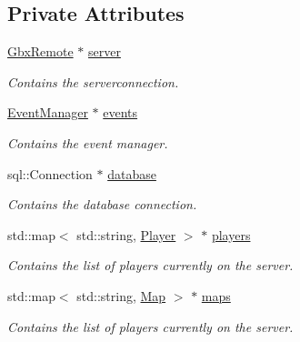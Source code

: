 \subsection*{Private Attributes}
\begin{DoxyCompactItemize}
\item 
\hypertarget{classCallBackManager_a27cccc154989a36eb80580f3d9f69c51}{\hyperlink{classGbxRemote}{Gbx\-Remote} $\ast$ \hyperlink{classCallBackManager_a27cccc154989a36eb80580f3d9f69c51}{server}}\label{classCallBackManager_a27cccc154989a36eb80580f3d9f69c51}

\begin{DoxyCompactList}\small\item\em Contains the serverconnection. \end{DoxyCompactList}\item 
\hypertarget{classCallBackManager_a144945c3b30a7946674393b412746f8f}{\hyperlink{classEventManager}{Event\-Manager} $\ast$ \hyperlink{classCallBackManager_a144945c3b30a7946674393b412746f8f}{events}}\label{classCallBackManager_a144945c3b30a7946674393b412746f8f}

\begin{DoxyCompactList}\small\item\em Contains the event manager. \end{DoxyCompactList}\item 
\hypertarget{classCallBackManager_a64e970ca45d503658879c63c5b5297cd}{sql\-::\-Connection $\ast$ \hyperlink{classCallBackManager_a64e970ca45d503658879c63c5b5297cd}{database}}\label{classCallBackManager_a64e970ca45d503658879c63c5b5297cd}

\begin{DoxyCompactList}\small\item\em Contains the database connection. \end{DoxyCompactList}\item 
\hypertarget{classCallBackManager_a26e135142b37e3b02b72aa7a091ef854}{std\-::map$<$ std\-::string, \hyperlink{structPlayer}{Player} $>$ $\ast$ \hyperlink{classCallBackManager_a26e135142b37e3b02b72aa7a091ef854}{players}}\label{classCallBackManager_a26e135142b37e3b02b72aa7a091ef854}

\begin{DoxyCompactList}\small\item\em Contains the list of players currently on the server. \end{DoxyCompactList}\item 
\hypertarget{classCallBackManager_afad9b6092db2e3f98711d8e6ba6ff612}{std\-::map$<$ std\-::string, \hyperlink{structMap}{Map} $>$ $\ast$ \hyperlink{classCallBackManager_afad9b6092db2e3f98711d8e6ba6ff612}{maps}}\label{classCallBackManager_afad9b6092db2e3f98711d8e6ba6ff612}

\begin{DoxyCompactList}\small\item\em Contains the list of players currently on the server. \end{DoxyCompactList}\end{DoxyCompactItemize}


